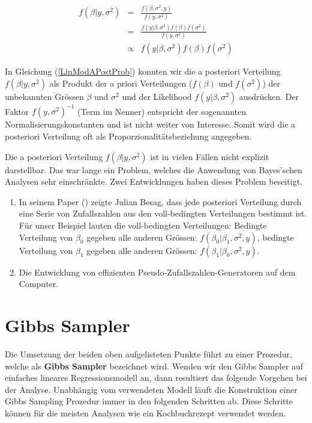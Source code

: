 \documentclass[]{book}
\providecommand{\tightlist}{%
  \setlength{\itemsep}{0pt}\setlength{\parskip}{0pt}}
\begin{document}
\begin{eqnarray}
f(\beta | y, \sigma^2) & =       & \frac{f(\beta, \sigma^2, y)}{f(y, \sigma^2)} \nonumber \\
                       & =       & \frac{f(y | \beta, \sigma^2)f(\beta)f(\sigma^2)}{f(y, \sigma^2)} \nonumber \\
                       & \propto & f(y | \beta, \sigma^2)f(\beta)f(\sigma^2)
\label{LinModAPostProb}
\end{eqnarray}

In Gleichung (\ref{LinModAPostProb}) konnten wir die a posteriori
Verteilung \(f(\beta | y, \sigma^2)\) als Produkt der a priori
Verteilungen (\(f(\beta)\) und \(f(\sigma^2)\)) der unbekannten Grössen
\(\beta\) und \(\sigma^2\) und der Likelihood \(f(y | \beta, \sigma^2)\)
ausdrücken. Der Faktor \(f(y, \sigma^2)^{-1}\) (Term im Nenner)
entspricht der sogenannten Normalisierungskonstanten und ist nicht
weiter von Interesse. Somit wird die a posteriori Verteilung oft als
Proporzionalitätsbeziehung angegeben.

Die a posteriori Verteilung \(f(\beta | y, \sigma^2)\) ist in vielen
Fällen nicht explizit darstellbar. Das war lange ein Problem, welches
die Anwendung von Bayes'schen Analysen sehr einschränkte. Zwei
Entwicklungen haben dieses Problem beseitigt.

\begin{enumerate}
\def\labelenumi{\arabic{enumi}.}
\tightlist
\item
  In seinem Paper (\citet{Besa1974}) zeigte Julian Besag, dass jede
  posteriori Verteilung durch eine Serie von Zufallszahlen aus den
  voll-bedingten Verteilungen bestimmt ist. Für unser Beispiel lauten
  die voll-bedingten Verteilungen: Bedingte Verteilung von \(\beta_0\)
  gegeben alle anderen Grössen: \(f(\beta_0 | \beta_1, \sigma^2, y)\),
  bedingte Verteilung von \(\beta_1\) gegeben alle anderen Grössen:
  \(f(\beta_1 | \beta_0, \sigma^2, y)\).
\item
  Die Entwicklung von effizienten Pseudo-Zufallszahlen-Generatoren auf
  dem Computer.
\end{enumerate}

\section{Gibbs Sampler}\label{gibbs-sampler}

Die Umsetzung der beiden oben aufgelisteten Punkte führt zu einer
Prozedur, welche als \textbf{Gibbs Sampler} bezeichnet wird. Wenden wir
den Gibbs Sampler auf einfaches lineares Regressionsmodell an, dann
resultiert das folgende Vorgehen bei der Analyse. Unabhängig vom
verwendeten Modell läuft die Konstruktion einer Gibbs Sampling Prozedur
immer in den folgenden Schritten ab. Diese Schritte können für die
meisten Analysen wie ein Kochbuchrezept verwendet werden.
\end{document}
